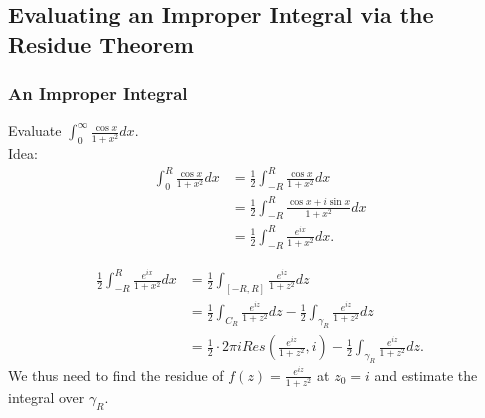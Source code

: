 \documentclass{article}
\begin{document}
\subsection{Evaluating an Improper Integral via the Residue Theorem}

\subsubsection{An Improper Integral}
Evaluate $\int_0^{\infty} \frac{\cos x}{1 + x^2}dx$. \\
Idea: 
\begin{align*}
\int_0^R \frac{\cos x}{1 + x^2} dx &= \frac{1}{2} \int_{-R}^R \frac{\cos x}{1 + x^2}dx \\
&= \frac{1}{2} \int_{-R}^{R} \frac{\cos x + i \sin x}{1 + x^2}dx \\
&= \frac{1}{2} \int_{-R}^{R} \frac{e^{ix}}{1 + x^2}dx.
\end{align*}

\begin{figure}[h]
\centering
{}
\end{figure}

\begin{align*}
\frac{1}{2}\int_{-R}^{R}\frac{e^{ix}}{1 + x^2} dx &= \frac{1}{2} \int_{[-R,R]} \frac{e^{iz}}{1 + z^2}dz \\
&= \frac{1}{2} \int_{C_R} \frac{e^{iz}}{1 + z^2}dz - \frac{1}{2} \int_{\gamma_R} \frac{e^{iz}}{1 + z^2}dz \\
&= \frac{1}{2} \cdot 2\pi i Res(\frac{e^{iz}}{1+z^2},i) - \frac{1}{2} \int_{\gamma_R} \frac{e^{iz}}{1+z^2}dz.
\end{align*}
We thus need to find the residue of $f(z) = \frac{e^{iz}}{1+z^2}$ at $z_0 = i$ and estimate the integral over $\gamma_R$.
\end{document}

